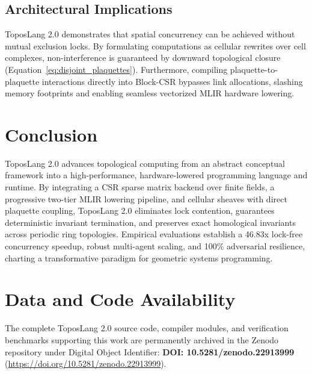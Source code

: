 \documentclass[conference]{IEEEtran}
\begin{document}
\subsection{Architectural Implications}
ToposLang 2.0 demonstrates that spatial concurrency can be achieved without mutual exclusion locks. By formulating computations as cellular rewrites over cell complexes, non-interference is guaranteed by downward topological closure (Equation~\eqref{eq:disjoint_plaquettes}). Furthermore, compiling plaquette-to-plaquette interactions directly into Block-CSR bypasses link allocations, slashing memory footprints and enabling seamless vectorized MLIR hardware lowering.

\section{Conclusion}
ToposLang 2.0 advances topological computing from an abstract conceptual framework into a high-performance, hardware-lowered programming language and runtime. By integrating a CSR sparse matrix backend over finite fields, a progressive two-tier MLIR lowering pipeline, and cellular sheaves with direct plaquette coupling, ToposLang 2.0 eliminates lock contention, guarantees deterministic invariant termination, and preserves exact homological invariants across periodic ring topologies. Empirical evaluations establish a 46.83x lock-free concurrency speedup, robust multi-agent scaling, and 100\% adversarial resilience, charting a transformative paradigm for geometric systems programming.

\section*{Data and Code Availability}
The complete ToposLang 2.0 source code, compiler modules, and verification benchmarks supporting this work are permanently archived in the Zenodo repository under Digital Object Identifier: \textbf{DOI: 10.5281/zenodo.22913999} (\url{https://doi.org/10.5281/zenodo.22913999}).
\end{document}

